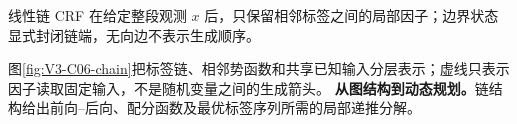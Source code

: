 \documentclass[UTF8,a4paper,11pt,openany]{ctexbook}
\begin{document}
\setcounter{page}{496}
\setcounter{chapter}{22}
\setcounter{figure}{0}
\pagestyle{headings}
\begin{geometrybox}
线性链 CRF 在给定整段观测 $x$ 后，只保留相邻标签之间的局部因子；边界状态显式封闭链端，无向边不表示生成顺序。
\end{geometrybox}

图\ref{fig:V3-C06-chain}把标签链、相邻势函数和共享已知输入分层表示；虚线只表示因子读取固定输入，不是随机变量之间的生成箭头。
\textbf{从图结构到动态规划。}链结构给出前向--后向、配分函数及最优标签序列所需的局部递推分解。
\end{document}
